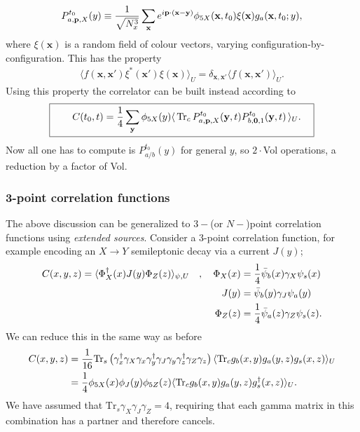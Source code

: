 \begin{align}
  P^{t_0}_{a,{\textbf{p}},X}(y) \equiv {1\over \sqrt{N_x^3}} \sum_{\textbf{x}} e^{i{\textbf{p}}\cdot ({\textbf{x}}-{\textbf{y}})} \phi_{5X}({\textbf{x}},t_0) \xi({\textbf{x}}) g_a({\textbf{x}},t_0;y),
  \label{eq:onesided_prop}
\end{align}
where $\xi({\textbf{x}})$ is a random field of colour vectors, varying configuration-by-configuration. This has the property
\begin{align}
  \langle f({\textbf{x}},{\textbf{x}}') \xi^*({\textbf{x}}')\xi({\textbf{x}})\rangle_U = \delta_{{\textbf{x}},{\textbf{x}}'} \langle f({\textbf{x}},{\textbf{x}}') \rangle_U.
\end{align}
Using this property the correlator can be built instead according to
\begin{align}
  \boxed{\quad  \quad C(t_0,t) = {1\over 4} \sum_{\textbf{y}} \phi_{5X}(y) \langle \,\text{Tr}_c \, P^{t_0}_{a,{\textbf{p}},X}({\textbf{y}},t) P^{t_0}_{b,{\textbf{0}},1}({\textbf{y}},t) \,\rangle_U. \quad}
  \label{eq:tietogether}
\end{align}
Now all one has to compute is $P^{t_0}_{a/b}(y)$ for general $y$, so $2\cdot$Vol operations, a reduction by a factor of Vol.

\subsubsection{3-point correlation functions}

The above discussion can be generalized to $3-$(or $N-$)point correlation functions using {\it{extended sources}}. Consider a 3-point correlation function, for example encoding an $X\to Y$ semileptonic decay via a current $J(y)$;
\begin{align}
  C(x,y,z) = \langle \Phi^{\dagger}_X(x) J(y) \Phi_Z(z) \rangle_{\psi,U} \quad , \quad \Phi_X(x) &= {1\over 4} \bar{\psi}_b(x) \gamma_X \psi_s(x) \\
  \nonumber
  J(y) &= \bar{\psi}_b(y)\gamma_J\psi_a(y) \\
  \nonumber
  \Phi_Z(z) &= {1\over 4}\bar{\psi}_a(z)\gamma_Z \psi_s(z).
\end{align}
We can reduce this in the same way as before
\begin{align}
  C(x,y,z) &= {1\over 16} \text{Tr}_s\left( \gamma^{\dagger}_x \gamma_X \gamma_x \gamma^{\dagger}_y \gamma_J \gamma_y \gamma^{\dagger}_z \gamma_Z \gamma_z \right) \langle \text{Tr}_c g_{b}(x,y) g_{a}(y,z) g_{s}(x,z)\rangle_U \\
  &= {1\over 4} \phi_{5X}(x) \phi_J(y) \phi_{5Z}(z) \langle \text{Tr}_c g_{b}(x,y) g_{a}(y,z) g^{\dagger}_{s}(x,z) \rangle_U.
\end{align}
We have assumed that $\text{Tr}_s \gamma_X\gamma_J\gamma_Z = 4$, requiring that each gamma matrix in this combination has a partner and therefore cancels.

